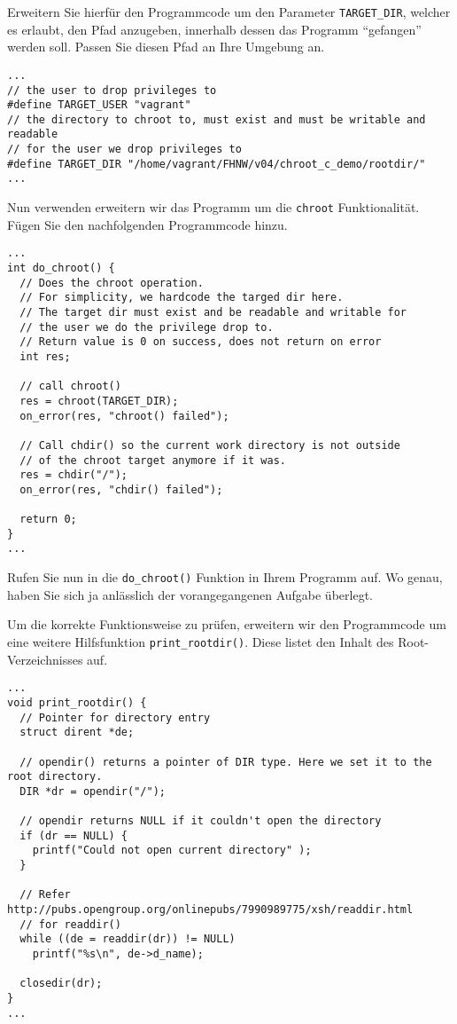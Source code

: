 \documentclass[DIN, pagenumber=false, fontsize=11pt, parskip=half]{scrartcl}
\begin{document}
Erweitern Sie hierfür den Programmcode um den Parameter
\texttt{TARGET\_DIR}, welcher es erlaubt, den Pfad anzugeben, innerhalb
dessen das Programm ``gefangen'' werden soll.  Passen Sie diesen Pfad an
Ihre Umgebung an.

\begin{lstlisting}[style=CStyle]
...
// the user to drop privileges to
#define TARGET_USER "vagrant"
// the directory to chroot to, must exist and must be writable and readable
// for the user we drop privileges to
#define TARGET_DIR "/home/vagrant/FHNW/v04/chroot_c_demo/rootdir/"
...
\end{lstlisting}

Nun verwenden erweitern wir das Programm um die \texttt{chroot}
Funktionalität.  Fügen Sie den nachfolgenden Programmcode hinzu.

\begin{lstlisting}[style=CStyle]
...
int do_chroot() {
  // Does the chroot operation.
  // For simplicity, we hardcode the targed dir here.
  // The target dir must exist and be readable and writable for
  // the user we do the privilege drop to.
  // Return value is 0 on success, does not return on error
  int res;
  
  // call chroot()
  res = chroot(TARGET_DIR);
  on_error(res, "chroot() failed");    

  // Call chdir() so the current work directory is not outside
  // of the chroot target anymore if it was.
  res = chdir("/");
  on_error(res, "chdir() failed");
  
  return 0;
}
...
\end{lstlisting}

Rufen Sie nun in die \texttt{do\_chroot()} Funktion in Ihrem Programm auf. 
Wo genau, haben Sie sich ja anlässlich der vorangegangenen Aufgabe überlegt.

Um die korrekte Funktionsweise zu prüfen, erweitern wir den Programmcode um
eine weitere Hilfsfunktion \texttt{print\_rootdir()}.  Diese listet den
Inhalt des Root-Verzeichnisses auf.

\newpage

\begin{lstlisting}[style=CStyle]
...
void print_rootdir() {
  // Pointer for directory entry
  struct dirent *de; 
  
  // opendir() returns a pointer of DIR type. Here we set it to the root directory. 
  DIR *dr = opendir("/"); 
  
  // opendir returns NULL if it couldn't open the directory
  if (dr == NULL) { 
    printf("Could not open current directory" );
  } 
  
  // Refer http://pubs.opengroup.org/onlinepubs/7990989775/xsh/readdir.html 
  // for readdir() 
  while ((de = readdir(dr)) != NULL) 
    printf("%s\n", de->d_name); 
  
  closedir(dr);
}
...
\end{lstlisting}
\end{document}
